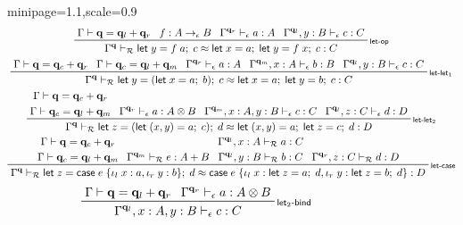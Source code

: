 \documentclass[acmsmall,screen,anonymous,review]{acmart}
\newcommand{\mc}[1]{\ensuremath{\mathcal{#1}}}
\newcommand{\mb}[1]{\ensuremath{\mathbf{#1}}}
\newcommand{\ms}[1]{\ensuremath{\mathsf{#1}}}
\newcommand{\lto}{:}
\newcommand{\linl}[1]{\iota_l\;{#1}}
\newcommand{\linr}[1]{\iota_r\;{#1}}
\newcommand{\letexpr}[3]{\ensuremath{\ms{let}\;#1 = #2;\;#3}}
\newcommand{\caseexpr}[5]{\ms{case}\;#1\;\{\linl{#2} \lto #3, \linr{#4} \lto #5\}}
\newcommand{\qsp}[4]{#1 \vdash #2 = #3 + #4}
\newcommand{\rle}[1]{{\scriptsize\textsf{#1}}}
\newcommand{\hasty}[4]{#1 \vdash_{#2} #3: {#4}}
\newcommand{\teqv}{\approx}
\newcommand{\tmeq}[5]{#1 \vdash_{#2} #3 \teqv #4 : {#5}}
\begin{document}
\begin{figure}
  \begin{adjustbox}{minipage=1.1\textwidth,scale=0.9}
  \begin{gather*}
    \prftree[r]{\rle{let-op}}
      {\qsp{\Gamma}{\mb{q}}{\mb{q}_l}{\mb{q}_r}}
      {f : A \to_\epsilon B}
      {\hasty{\Gamma^{\mb{q}_r}}{\epsilon}{a}{A}}
      {\hasty{\Gamma^{\mb{q}_l}, y : B}{\epsilon}{c}{C}}
      {\tmeq{\Gamma^{\mb{q}}}{\mc{R}}
        {\letexpr{y}{f\;a}{c}}
        {\letexpr{x}{a}{\letexpr{y}{f\;x}{c}}}
        {C}}
      \\
    \prftree[r]{\rle{let-let$_1$}}
      {\qsp{\Gamma}{\mb{q}}{\mb{q}_c}{\mb{q}_r}}
      {\qsp{\Gamma}{\mb{q}_c}{\mb{q}_l}{\mb{q}_m}}
      {\hasty{\Gamma^{\mb{q}_r}}{\epsilon}{a}{A}}
      {\hasty{\Gamma^{\mb{q}_m}, x : A}{\epsilon}{b}{B}}
      {\hasty{\Gamma^{\mb{q}_l}, y : B}{\epsilon}{c}{C}}
      {
        \tmeq{\Gamma^{\mb{q}}}{\mc{R}}
          {\letexpr{y}{(\letexpr{x}{a}{b})}{c}}
          {\letexpr{x}{a}{\letexpr{y}{b}{c}}}
          {C}
      }
      \\
    \prftree[r]{\rle{let-let$_2$}}
      {
        \prfStackPremises
        {\qsp{\Gamma}{\mb{q}}{\mb{q}_c}{\mb{q}_r}}
        {\qsp{\Gamma}{\mb{q}_c}{\mb{q}_l}{\mb{q}_m}}
      }
      {\hasty{\Gamma^{\mb{q}_r}}{\epsilon}{a}{A \otimes B}}
      {\hasty{\Gamma^{\mb{q}_m}, x : A, y : B}{\epsilon}{c}{C}}
      {\hasty{\Gamma^{\mb{q}_l}, z : C}{\epsilon}{d}{D}}
      {
        \tmeq{\Gamma^{\mb{q}}}{\mc{R}}
          {\letexpr{z}{(\letexpr{(x, y)}{a}{c})}{d}}
          {\letexpr{(x, y)}{a}{\letexpr{z}{c}{d}}}
          {D}
      }
      \\
    \prftree[r]{\rle{let-case}}
      {
        \prfStackPremises
        {\qsp{\Gamma}{\mb{q}}{\mb{q}_c}{\mb{q}_r}}
        {\qsp{\Gamma}{\mb{q}_c}{\mb{q}_l}{\mb{q}_m}}
      }
      {\hasty{\Gamma^{\mb{q}_m}}{\mc{R}}{e}{A + B}}
      {
        \prfStackPremises
        {\hasty{\Gamma^{\mb{q}_l}, x : A}{\mc{R}}{a}{C}}
        {\hasty{\Gamma^{\mb{q}_l}, y : B}{\mc{R}}{b}{C}}
      }
      {
        {\hasty{\Gamma^{\mb{q}_r}, z : C}{\mc{R}}{d}{D}}
      }
      {\tmeq{\Gamma^{\mb{q}}}{\mc{R}}
        {\letexpr{z}{\caseexpr{e}{x}{a}{y}{b}}{d}}
        {\caseexpr{e}{x}{\letexpr{z}{a}{d}}{y}{\letexpr{z}{b}{d}}}
        {D}
      } 
  \end{gather*}
  \begin{gather*}
    \prftree[r]{\rle{let$_2$-bind}}
      {\qsp{\Gamma}{\mb{q}}{\mb{q}_l}{\mb{q}_r}}
      {\hasty{\Gamma^{\mb{q}_r}}{\epsilon}{a}{A \otimes B}}
      {\hasty{\Gamma^{\mb{q}_l}, x : A, y : B}{\epsilon}{c}{C}}

\end{gather*}
\end{adjustbox}
\end{figure}
\end{document}
